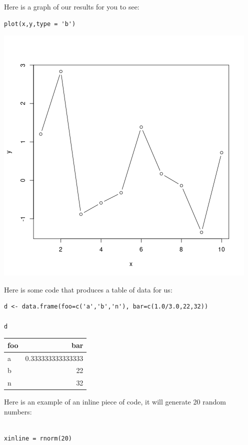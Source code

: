\documentclass{article}
\begin{document}
Here is a graph of our results for you to see: 

\begin{verbatim}
plot(x,y,type = 'b')
\end{verbatim}

\begin{center}
\includegraphics[width=.9\linewidth]{simplePlot.png}
\end{center}


Here is some code that produces a table of data for us:
\begin{verbatim}
d <- data.frame(foo=c('a','b','n'), bar=c(1.0/3.0,22,32))

d

\end{verbatim}

\begin{center}
\begin{tabular}{lr}
foo & bar\\
\hline
a & 0.333333333333333\\
b & 22\\
n & 32\\
\end{tabular}
\end{center}



Here is an example of an inline piece of code, it will generate 20 random numbers:
\begin{verbatim}

xinline = rnorm(20)

\end{verbatim}
\end{document}
